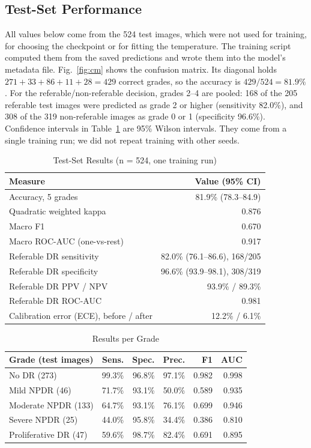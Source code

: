 \documentclass[conference]{IEEEtran}
\begin{document}
\subsection{Test-Set Performance}
All values below come from the 524 test images, which were not used for training, for choosing the checkpoint or for
fitting the temperature. The training script computed them from the saved predictions and wrote them into the model's
metadata file. Fig.~\ref{fig:cm} shows the confusion matrix. Its diagonal holds $271+33+86+11+28 = 429$ correct
grades, so the accuracy is $429/524 = 81.9\%$. For the referable/non-referable decision, grades 2--4 are pooled: 168 of
the 205 referable test images were predicted as grade 2 or higher (sensitivity 82.0\%), and 308 of the 319
non-referable images as grade 0 or 1 (specificity 96.6\%). Confidence intervals in Table~\ref{tab:metrics} are 95\%
Wilson intervals. They come from a single training run; we did not repeat training with other seeds.

\begin{table}[t]
\caption{Test-Set Results (n = 524, one training run)}
\label{tab:metrics}
\centering\scriptsize
\begin{tabular}{@{}lr@{}}
\toprule
Measure & Value (95\% CI) \\
\midrule
Accuracy, 5 grades & 81.9\% (78.3--84.9) \\
Quadratic weighted kappa & 0.876 \\
Macro F1 & 0.670 \\
Macro ROC-AUC (one-vs-rest) & 0.917 \\
\midrule
Referable DR sensitivity & 82.0\% (76.1--86.6), 168/205 \\
Referable DR specificity & 96.6\% (93.9--98.1), 308/319 \\
Referable DR PPV / NPV & 93.9\% / 89.3\% \\
Referable DR ROC-AUC & 0.981 \\
\midrule
Calibration error (ECE), before / after & 12.2\% / 6.1\% \\
\bottomrule
\end{tabular}
\end{table}

\begin{table}[t]
\caption{Results per Grade}
\label{tab:perclass}
\centering\scriptsize
\begin{tabular}{@{}lrrrrr@{}}
\toprule
Grade (test images) & Sens. & Spec. & Prec. & F1 & AUC \\
\midrule
No DR (273) & 99.3\% & 96.8\% & 97.1\% & 0.982 & 0.998 \\
Mild NPDR (46) & 71.7\% & 93.1\% & 50.0\% & 0.589 & 0.935 \\
Moderate NPDR (133) & 64.7\% & 93.1\% & 76.1\% & 0.699 & 0.946 \\
Severe NPDR (25) & 44.0\% & 95.8\% & 34.4\% & 0.386 & 0.810 \\
Proliferative DR (47) & 59.6\% & 98.7\% & 82.4\% & 0.691 & 0.895 \\
\bottomrule
\end{tabular}
\end{table}
\end{document}
